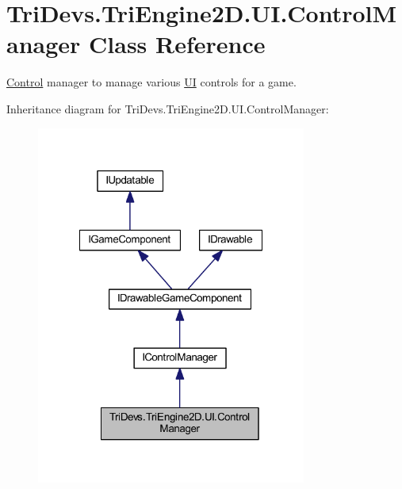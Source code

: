 \hypertarget{class_tri_devs_1_1_tri_engine2_d_1_1_u_i_1_1_control_manager}{\section{Tri\-Devs.\-Tri\-Engine2\-D.\-U\-I.\-Control\-Manager Class Reference}
\label{class_tri_devs_1_1_tri_engine2_d_1_1_u_i_1_1_control_manager}
}


\hyperlink{class_tri_devs_1_1_tri_engine2_d_1_1_u_i_1_1_control}{Control} manager to manage various \hyperlink{namespace_tri_devs_1_1_tri_engine2_d_1_1_u_i}{U\-I} controls for a game.  




Inheritance diagram for Tri\-Devs.\-Tri\-Engine2\-D.\-U\-I.\-Control\-Manager\-:
\nopagebreak
\begin{figure}[H]
\begin{center}
\leavevmode
\includegraphics[width=251pt]{class_tri_devs_1_1_tri_engine2_d_1_1_u_i_1_1_control_manager__inherit__graph}
\end{center}
\end{figure}


